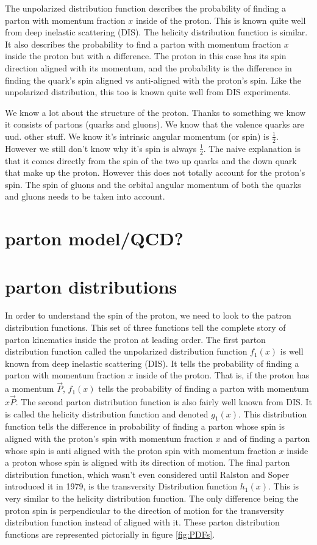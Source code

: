 \documentclass[abstract = on,listof=totoc, bibliography=totoc]{scrreprt}
\begin{document}
The unpolarized distribution function describes the probability of finding a parton with momentum fraction $x$ inside of the proton. This is known quite well from deep inelastic scattering (DIS). The helicity distribution function is similar. It also describes the probability to find a parton with momentum fraction $x$ inside the proton but with a difference. The proton in this case has its spin direction aligned with its momentum, and the probability is the difference in finding the quark's spin aligned vs anti-aligned with the proton's spin. Like the unpolarized distribution, this too is known quite well from DIS experiments.


We know a lot about the structure of the proton. Thanks to something we know it consists of partons (quarks and gluons). We know that the valence quarks are uud. other stuff. We know it's intrinsic angular momentum (or spin) is $\frac{1}{2}$. However we still don't know why it's spin is always $\frac{1}{2}$.  The naive explanation is that it comes directly from the spin of the two up quarks and the down quark that make up the proton. However this does not totally account for the proton's spin. The spin of gluons and the orbital angular momentum of both the quarks and gluons needs to be taken into account.   


\section{parton model/QCD?}
\section{parton distributions}

In order to understand the spin of the proton, we need to look to the patron distribution functions. This set of three functions tell the complete story of parton kinematics inside the proton at leading order. The first parton distribution function called the unpolarized distribution function $f_1(x)$ is well known from deep inelastic scattering (DIS). It tells the probability of finding a parton with momentum fraction $x$ inside of the proton. That is, if the proton has a momentum $\vec{P}$, $f_1(x)$ tells the probability of finding a parton with momentum $x\vec{P}$.  The second parton distribution function is also fairly well known from DIS. It is called the helicity distribution function and denoted $g_1(x)$. This distribution function tells the difference in probability of finding a parton whose spin is aligned with the proton's spin with momentum fraction $x$ and of finding a parton whose spin is anti aligned with the proton spin with momentum fraction $x$ inside a proton whose spin is aligned with its direction of motion. The final parton distribution function, which wasn't even considered until Ralston and Soper introduced it in 1979\cite{transIntroduced}, is the transversity Distribution function $h_1(x)$. This is very similar to the helicity distribution function. The only difference being the proton spin is perpendicular to the direction of motion for the transversity distribution function instead of aligned with it. These parton distribution functions are represented pictorially in figure \ref{fig:PDFs}. \\
\end{document}
